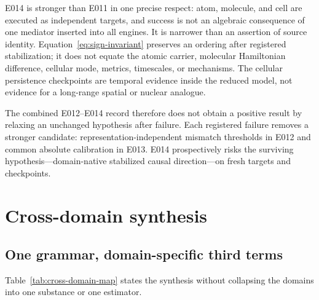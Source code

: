 \documentclass[11pt,a4paper]{article}
\begin{document}
E014 is stronger than E011 in one precise respect: atom, molecule, and cell are executed as independent targets, and success is not an algebraic consequence of one mediator inserted into all engines. It is narrower than an assertion of source identity. Equation~\eqref{eq:sign-invariant} preserves an ordering after registered stabilization; it does not equate the atomic carrier, molecular Hamiltonian difference, cellular mode, metrics, timescales, or mechanisms. The cellular persistence checkpoints are temporal evidence inside the reduced model, not evidence for a long-range spatial or nuclear analogue.

The combined E012--E014 record therefore does not obtain a positive result by relaxing an unchanged hypothesis after failure. Each registered failure removes a stronger candidate: representation-independent mismatch thresholds in E012 and common absolute calibration in E013. E014 prospectively risks the surviving hypothesis---domain-native stabilized causal direction---on fresh targets and checkpoints.

\section{Cross-domain synthesis}

\subsection{One grammar, domain-specific third terms}

Table~\ref{tab:cross-domain-map} states the synthesis without collapsing the domains into one substance or one estimator.
\end{document}
